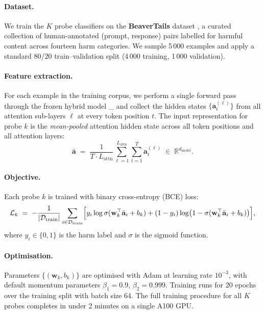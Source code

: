 \documentclass{article}
\newcommand{\piHybrid}{\pi_{\mathrm{hybrid}}}
\newcommand{\Atten}{\mathrm{Attn}}
\begin{document}
\paragraph{Dataset.}
We train the $K$ probe classifiers on the \textbf{BeaverTails} dataset
\citep{Ji2023BeaverTails}, a curated collection of human-annotated
(prompt, response) pairs labelled for harmful content across fourteen harm
categories.  We sample 5\,000 examples and apply a standard 80/20 train--validation
split (4\,000 training, 1\,000 validation).

\paragraph{Feature extraction.}
For each example in the training corpus, we perform a single forward pass through
the frozen hybrid model \piHybrid{} and collect the hidden states
$\{\mathbf{a}_t^{(\ell)}\}$ from all \Atten{} attention sub-layers $\ell$ at
every token position $t$.  The input representation for probe $k$ is the
\emph{mean-pooled} attention hidden state across all token positions and all
attention layers:
\begin{equation}
  \bar{\mathbf{a}} \;=\;
  \frac{1}{T \cdot L_{\mathrm{attn}}}
  \sum_{\ell=1}^{L_{\mathrm{attn}}} \sum_{t=1}^{T}
  \mathbf{a}_t^{(\ell)}
  \;\in\; \mathbb{R}^{d_{\mathrm{model}}}.
  \label{eq:mean-pool}
\end{equation}

\paragraph{Objective.}
Each probe $k$ is trained with binary cross-entropy (BCE) loss:
\begin{equation}
  \mathcal{L}_k
  \;=\; -\frac{1}{|\mathcal{D}_{\mathrm{train}}|}
  \sum_{i \in \mathcal{D}_{\mathrm{train}}}
  \Bigl[
    y_i \log \sigma(\mathbf{w}_k^{\top}\bar{\mathbf{a}}_i + b_k)
    + (1 - y_i)\log\bigl(1 - \sigma(\mathbf{w}_k^{\top}\bar{\mathbf{a}}_i + b_k)\bigr)
  \Bigr],
  \label{eq:bce}
\end{equation}
where $y_i \in \{0,1\}$ is the harm label and $\sigma$ is the sigmoid function.

\paragraph{Optimisation.}
Parameters $\{(\mathbf{w}_k, b_k)\}$ are optimised with Adam
\citep{Kingma2015Adam} at learning rate $10^{-3}$, with default momentum
parameters $\beta_1 = 0.9$, $\beta_2 = 0.999$.  Training runs for 20 epochs
over the training split with batch size 64.  The full training procedure for all
$K$ probes completes in under 2 minutes on a single A100 GPU.
\end{document}
